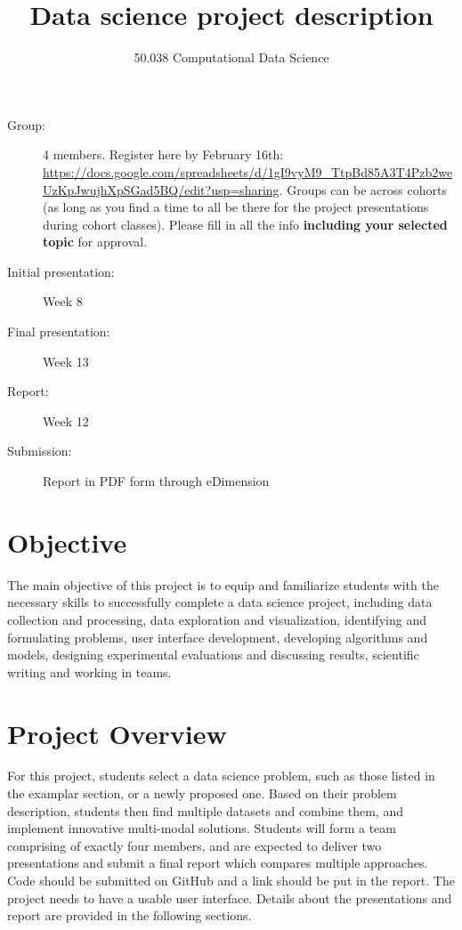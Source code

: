 \documentclass[DIV12, oneside]{scrartcl}
\date{}
\begin{document}
\title{Data science project description}
\subtitle{50.038 Computational Data Science}
\maketitle

\begin{description}
\item [Group:] 4 members. Register here by February 16th: \url{https://docs.google.com/spreadsheets/d/1gI9vyM9_TtpBd85A3T4Pzb2weUzKpJwujhXpSGad5BQ/edit?usp=sharing}.  Groups can be across cohorts (as long as you find a time to all be there for the project presentations during cohort classes). Please fill in all the info \textbf{including your selected topic} for approval. 

\item [Initial presentation:] Week 8

\item [Final presentation:] Week 13 

\item [Report:] Week 12 

\item [Submission: ] Report in PDF form through eDimension

\end{description}



\section{Objective}

The main objective of this project is to equip and familiarize students with the necessary skills to successfully complete a data science project, including data collection and processing, data exploration and visualization, identifying and formulating problems, user interface development, developing algorithms and models, designing experimental evaluations and discussing results, scientific writing and working in teams. %

\section{Project Overview}

For this project, students select a data science problem, such as those listed in the examplar section, or a newly proposed one. Based on their problem description, students then find multiple datasets and combine them, and implement innovative multi-modal solutions. Students will form a team comprising of exactly four members, and are expected to deliver two presentations and submit a final report which compares multiple approaches. Code should be submitted on GitHub and a link should be put in the report. The project needs to have a usable user interface. Details about the presentations and report are provided in the following sections. 
\end{document}
